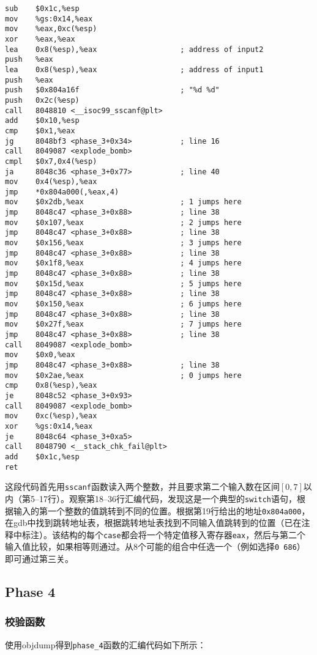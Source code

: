 \documentclass[a4paper, 11pt]{ctexart}
\begin{document}
\begin{verbatim}
sub    $0x1c,%esp
mov    %gs:0x14,%eax
mov    %eax,0xc(%esp)
xor    %eax,%eax
lea    0x8(%esp),%eax                   ; address of input2
push   %eax
lea    0x8(%esp),%eax                   ; address of input1
push   %eax
push   $0x804a16f                       ; "%d %d"
push   0x2c(%esp)
call   8048810 <__isoc99_sscanf@plt>
add    $0x10,%esp
cmp    $0x1,%eax
jg     8048bf3 <phase_3+0x34>           ; line 16
call   8049087 <explode_bomb>
cmpl   $0x7,0x4(%esp)
ja     8048c36 <phase_3+0x77>           ; line 40
mov    0x4(%esp),%eax
jmp    *0x804a000(,%eax,4)
mov    $0x2db,%eax                      ; 1 jumps here
jmp    8048c47 <phase_3+0x88>           ; line 38
mov    $0x107,%eax                      ; 2 jumps here
jmp    8048c47 <phase_3+0x88>           ; line 38
mov    $0x156,%eax                      ; 3 jumps here
jmp    8048c47 <phase_3+0x88>           ; line 38
mov    $0x1f8,%eax                      ; 4 jumps here
jmp    8048c47 <phase_3+0x88>           ; line 38
mov    $0x15d,%eax                      ; 5 jumps here
jmp    8048c47 <phase_3+0x88>           ; line 38
mov    $0x150,%eax                      ; 6 jumps here
jmp    8048c47 <phase_3+0x88>           ; line 38
mov    $0x27f,%eax                      ; 7 jumps here
jmp    8048c47 <phase_3+0x88>           ; line 38
call   8049087 <explode_bomb>
mov    $0x0,%eax
jmp    8048c47 <phase_3+0x88>           ; line 38
mov    $0x2ae,%eax                      ; 0 jumps here
cmp    0x8(%esp),%eax
je     8048c52 <phase_3+0x93>
call   8049087 <explode_bomb>
mov    0xc(%esp),%eax
xor    %gs:0x14,%eax
je     8048c64 <phase_3+0xa5>
call   8048790 <__stack_chk_fail@plt>
add    $0x1c,%esp
ret
\end{verbatim}

这段代码首先用\texttt{sscanf}函数读入两个整数，并且要求第二个输入数在区间$[0,7]$以内（第5--17行）。观察第18--36行汇编代码，发现这是一个典型的\texttt{switch}语句，根据输入的第一个整数的值跳转到不同的位置。根据第19行给出的地址\texttt{0x804a000}，在gdb中找到跳转地址表，根据跳转地址表找到不同输入值跳转到的位置（已在注释中标注）。该结构的每个\texttt{case}都会将一个特定值移入寄存器\texttt{eax}，然后与第二个输入值比较，如果相等则通过。从8个可能的组合中任选一个（例如选择\texttt{0 686}）即可通过第三关。

\subsection{Phase 4}
\subsubsection{校验函数}
\label{sssec:phase4_checker}
使用objdump得到\texttt{phase\_4}函数的汇编代码如下所示：
\end{document}

